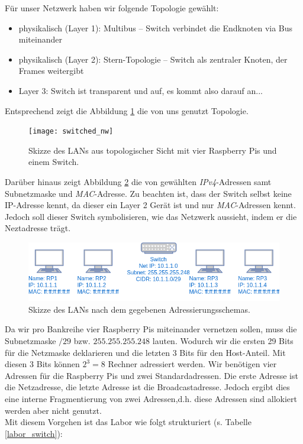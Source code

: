 \documentclass[paper=a4,fontsize=11pt]{scrartcl}%
\numberwithin{equation}{section}
\begin{document}
Für unser Netzwerk haben wir folgende Topologie gewählt:
\begin{itemize}
	\item physikalisch (Layer 1): Multibus -- Switch verbindet die Endknoten via Bus miteinander
	\item physikalisch (Layer 2): Stern-Topologie -- Switch als zentraler Knoten, der Frames weitergibt
	\item Layer 3: Switch ist transparent und auf, es kommt also darauf an...
\end{itemize}
Entsprechend zeigt die Abbildung \ref{switched_nw} die von uns genutzt Topologie.
\begin{figure}[H]
	\centering
	\texttt{[image: switched\_nw]} 
	\caption{Skizze des LANs aus topologischer Sicht mit vier Raspberry Pis und einem Switch.}
	\label{switched_nw}
\end{figure}
Darüber hinaus zeigt Abbildung \ref{switched_nw_full} die von gewählten \emph{IPv4}-Adressen samt Subnetzmaske und \emph{MAC}-Adresse. Zu beachten ist, dass der Switch selbst keine IP-Adresse kennt, da dieser ein Layer 2 Gerät ist und nur \emph{MAC}-Adressen kennt.\\
Jedoch soll dieser Switch symbolisieren, wie das Netzwerk aussieht, indem er die Neztadresse \glqq trägt\grqq.
\begin{figure}[H]
	\centering
	\includegraphics[scale=0.5]{switched_nw_full} 
	\caption{Skizze des LANs nach dem gegebenen Adressierungsschemas.}
	\label{switched_nw_full}
\end{figure}
Da wir pro Bankreihe vier Raspberry Pis miteinander vernetzen sollen, muss die Subnetzmaske $/29$ bzw. $255.255.255.248$ lauten. Wodurch wir die ersten 29 Bits für die Netzmaske deklarieren und die letzten 3 Bits für den Host-Anteil. Mit diesen 3 Bits können $2^3=8$ Rechner adressiert werden. Wir benötigen vier Adressen für die Raspberry Pis und zwei Standardadressen. Die erste Adresse ist die Netzadresse, die letzte Adresse ist die Broadcastadresse. Jedoch ergibt dies eine interne Fragmentierung von zwei Adressen,d.h. diese Adressen sind allokiert werden aber nicht genutzt.\\
Mit diesem Vorgehen ist das Labor wie folgt strukturiert (s. Tabelle \ref{labor_switch}):
\end{document}
